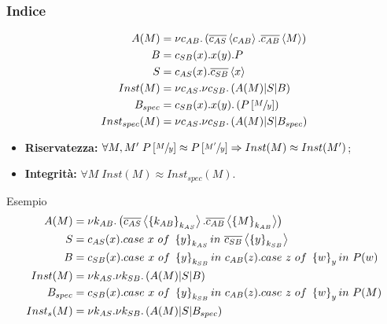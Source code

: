 





\section*{}

\begin{frame}[plain]
 \frametitle{Indice}
 \tableofcontents
\end{frame}


\begin{frame}
  \begin{align*}
    A(M) & = \nu
           c_{AB}. \left(\overline{c_{AS}}\left<c_{AB}\right>. \overline{c_{AB}}\left<M\right>\right)
    \\
    B & = c_{SB}(x). x(y) .P \\
    S & = c_{AS}(x) . \overline{c_{SB}} \left<x\right> \\
    Inst(M) & = \nu c_{AS}. \nu c_{SB}. \left( A(M) | S | B\right) \\
    B_{spec} & = c_{SB}(x). x(y). \left( P\left[\sfrac{M}{y}\right]\right) \\ 
    Inst_{spec}(M) & = \nu c_{AS}. \nu c_{SB}. \left( A(M) | S | B_{spec}\right)
  \end{align*}
  \begin{itemize}
  \item \textbf{Riservatezza:} $\forall M,M'\; P\left[\sfrac{M}{y}\right]
    \approx P\left[\sfrac{M'}{y}\right] \Rightarrow Inst(M) \approx Inst(M')$;
  \item \textbf{Integrit\`a:} $\forall M \; Inst(M) \approx
    Inst_{spec}(M)$.
  \end{itemize}
\end{frame}

\begin{frame}{Esempio}
  \begin{align*}
    A(M) & = \nu k_{AB}. \pa{
           \obar{c_{AS}}\ang{\set{k_{AB}}_{k_{AS}}}. \obar{c_{AB}}\ang{\set{M}_{k_{AB}}}}
    \\
    S & = c_{AS}(x).case\ x\ of\ \set{y}_{k_{AS}}in\ 
        \obar{c_{SB}}\ang{\set{y}_{k_{SB}}} \\ 
    B & = c_{SB}(x).case\ x\ of\ \set{y}_{k_{SB}}in\ c_{AB}(z). case\
        z\ of\ \set{w}_y in\ P(w) \\ 
    Inst(M) & = \nu k_{AS}. \nu k_{SB}. \pa{ A(M) | S | B } \\
    B_{spec} & = c_{SB}(x).case\ x\ of\ \set{y}_{k_{SB}}in\ 
               c_{AB}(z). case\ z\ of\ \set{w}_y in\ P(M) \\
    Inst_{s}(M) & = \nu k_{AS}. \nu k_{SB}. \pa{ A(M) | S | B_{spec}}
  \end{align*}
\end{frame}

